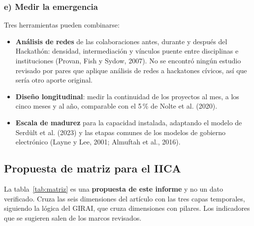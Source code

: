 \documentclass[11pt,a4paper]{article}
\begin{document}
\subsubsection*{e) Medir la emergencia}
Tres herramientas pueden combinarse:
\begin{itemize}
  \item \textbf{Análisis de redes} de las colaboraciones antes, durante y después del Hackathón: densidad, intermediación y vínculos puente entre disciplinas e instituciones (Provan, Fish y Sydow, 2007). No se encontró ningún estudio revisado por pares que aplique análisis de redes a hackatones cívicos, así que sería otro aporte original.
  \item \textbf{Diseño longitudinal}: medir la continuidad de los proyectos al mes, a los cinco meses y al año, comparable con el 5\,\% de Nolte et al. (2020).
  \item \textbf{Escala de madurez} para la capacidad instalada, adaptando el modelo de Serdült et al. (2023) y las etapas comunes de los modelos de gobierno electrónico (Layne y Lee, 2001; Almuftah et al., 2016).
\end{itemize}

\subsection{Propuesta de matriz para el IICA}

La tabla~\ref{tab:matriz} es una \textbf{propuesta de este informe} y no un dato verificado. Cruza las seis dimensiones del artículo con las tres capas temporales, siguiendo la lógica del GIRAI, que cruza dimensiones con pilares. Los indicadores que se sugieren salen de los marcos revisados.
\end{document}
